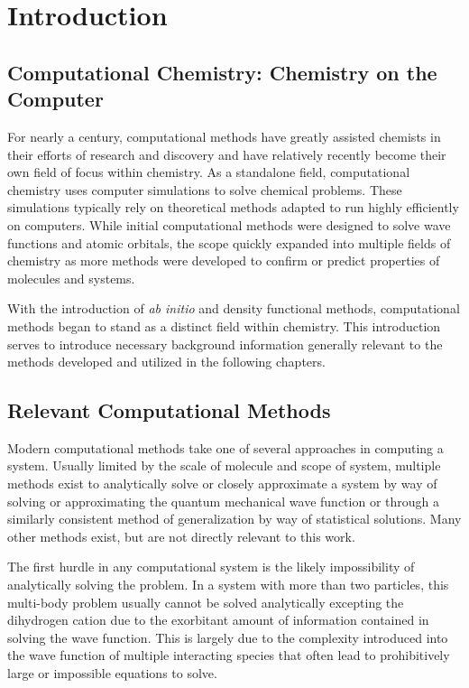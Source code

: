 \chapter{Introduction}
\label{ch:Introduction}

\section{Computational Chemistry: Chemistry on the Computer}

For nearly a century, computational methods have greatly assisted chemists in their efforts of research and discovery and have relatively recently become their own field of focus within chemistry.
As a standalone field, computational chemistry uses computer simulations to solve chemical problems. 
These simulations typically rely on theoretical methods adapted to run highly efficiently on computers.
While initial computational methods were designed to solve wave functions and atomic orbitals, the scope quickly expanded into multiple fields of chemistry as more methods were developed to confirm or predict properties of molecules and systems.

With the introduction of \textit{ab initio} and density functional methods, computational methods began to stand as a distinct field within chemistry. 
This introduction serves to introduce necessary background information generally relevant to the methods developed and utilized in the following chapters.

\section{Relevant Computational Methods}

Modern computational methods take one of several approaches in computing a system.
Usually limited by the scale of molecule and scope of system, multiple methods exist to analytically solve or closely approximate a system by way of solving or approximating the quantum mechanical wave function or through a similarly consistent method of generalization by way of statistical solutions.
Many other methods exist, but are not directly relevant to this work.

The first hurdle in any computational system is the likely impossibility of analytically solving the problem. 
In a system with more than two particles, this multi-body problem usually cannot be solved analytically excepting the dihydrogen cation due to the exorbitant amount of information contained in solving the wave function.
This is largely due to the complexity introduced into the wave function of multiple interacting species that often lead to prohibitively large or impossible equations to solve.

